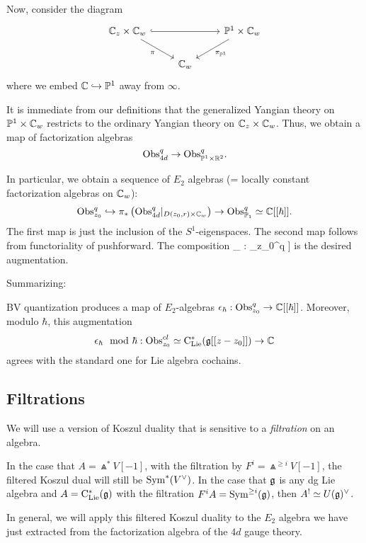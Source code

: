 \documentclass[11pt]{amsart}
\begin{document}
Now, consider the diagram
\[
\begin{tikzcd}
\CC_{z} \times \CC_w \ar[dr, "\pi"'] \ar[rr,hook] & & \PP^1 \times \CC_w \ar[dl, "\pi_{\PP^1}"] \\
& \CC_w &
\end{tikzcd} 
\]
where we embed $\mathbb C \hookrightarrow \mathbb P^1$ away from $\infty$. 

It is immediate from our definitions that the generalized Yangian theory on $\mathbb P^1 \times \mathbb C_w$ restricts to the ordinary Yangian theory on $\mathbb C_z \times \mathbb C_w$.
Thus, we obtain a map of factorization algebras
\[
{\rm Obs}^{q}_{4d} \to {\rm Obs}^{q}_{\mathbb P^1 \times \mathbb R^2} .
\]

In particular, we obtain a sequence of $E_2$ algebras (= locally constant factorization algebras on $\mathbb C_w$):
\[
{\rm Obs}_{z_0}^q \hookrightarrow \pi_*\left({\rm Obs}^{q}_{4d}|_{D(z_0,r) \times \mathbb C_w}\right) \to {\rm Obs}^q_{\mathbb P_1} \simeq \mathbb C[[\hbar]] .
\] 
The first map is just the inclusion of the $S^1$-eigenspaces. 
The second map follows from functoriality of pushforward.
The composition 
\beqn\label{aug}
\epsilon_{\hbar} : \Obs_{z_0}^q \to \CC[[\hbar]]
\eeqn
is the desired augmentation.

Summarizing:

\begin{cor}
BV quantization produces a map of $E_2$-algebras $\epsilon_{\hbar} : {\rm Obs}^q_{z_0} \to \mathbb C[[\hbar]]$. 
Moreover, modulo $\hbar$, this augmentation
\[
\epsilon_\hbar \mod \hbar : {\rm Obs}^{cl}_{z_0} \simeq {\rm C}_{{\rm Lie}}^*(\mathfrak g[[z-z_0]]) \to \mathbb C
\]
agrees with the standard one for Lie algebra cochains. 
\end{cor}

\subsection{Filtrations}

We will use a version of Koszul duality that is sensitive to a {\em filtration} on an algebra. 

In the case that $A = \Wedge^* V[-1]$, with the filtration by $F^i = \Wedge^{\geq i} V[-1]$, the filtered Koszul dual will still be ${\rm Sym}^*(V^\vee)$. 
In the case that $\mathfrak g$ is any dg Lie algebra and $A = {\rm C}_{{\rm Lie}}^*(\mathfrak g)$ with the filtration $F^i A = {\rm Sym}^{\geq i} (\mathfrak g)$, then $A^! \simeq U(\mathfrak g)^\vee$. 

In general, we will apply this filtered Koszul duality to the $E_2$ algebra we have just extracted from the factorization algebra of the $4d$ gauge theory. 
\end{document}

